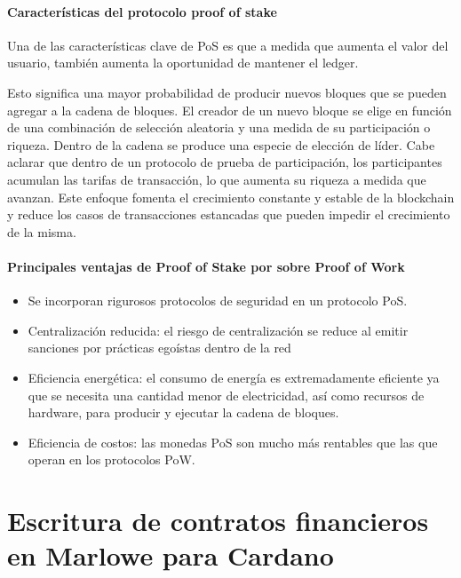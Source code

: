 \documentclass[12pt]{book}
\begin{document}
\subsubsection{Características del protocolo proof of stake}

Una de las características clave de PoS es que a medida que aumenta el valor del usuario, también aumenta la oportunidad de mantener el ledger.

Esto significa una mayor probabilidad de producir nuevos bloques que se pueden agregar a la cadena de bloques. El creador de un nuevo bloque se elige en función de una combinación de selección aleatoria y una medida de su participación o riqueza. Dentro de la cadena se produce una especie de elección de líder. Cabe aclarar que dentro de un protocolo de prueba de participación, los participantes acumulan las tarifas de transacción, lo que aumenta su riqueza a medida que avanzan. Este enfoque fomenta el crecimiento constante y estable de la blockchain y reduce los casos de transacciones estancadas que pueden impedir el crecimiento de la misma.

\subsubsection{Principales ventajas de Proof of Stake por sobre Proof of Work}

\begin{itemize}
	\item Se incorporan rigurosos protocolos de seguridad en un protocolo PoS.
	\item Centralización reducida: el riesgo de centralización se reduce al emitir sanciones por prácticas egoístas dentro de la red
	\item Eficiencia energética: el consumo de energía es extremadamente eficiente ya que se necesita una cantidad menor de electricidad, así como recursos de hardware, para producir y ejecutar la cadena de bloques.
	\item Eficiencia de costos: las monedas PoS son mucho más rentables que las que operan en los protocolos PoW.
\end{itemize}






\chapter[Escritura de contratos financieros en
  Marlowe]{Escritura de contratos financieros en Marlowe para Cardano}
\end{document}

